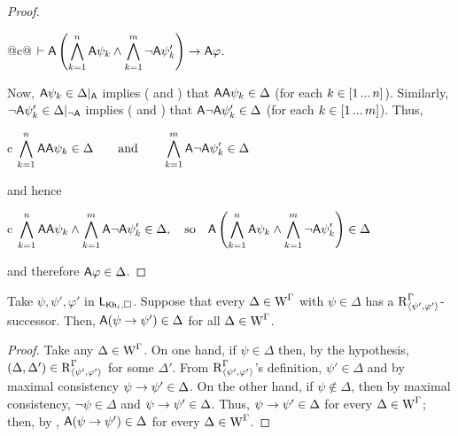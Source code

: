 \begin{proof}
\begin{ctabular}{@{}c@{}}
$\vdash
\displaystyle
{\sf A}\left( \bigwedge_{k=1}^{n} {\sf A}\psi_k \land \bigwedge_{k=1}^{m} \lnot {\sf A}\psi'_k \right)
\rightarrow {\sf A}\varphi$.
\end{ctabular}

Now, ${\sf A}\psi_k \in \Delta\vert_{{\sf A}}$ implies ( and ) that ${\sf A}{\sf A}\psi_k \in \Delta$ (for each $k \in [1 \mathop{...} n]$).
Similarly, $\lnot {\sf A}\psi'_k \in \Delta\vert_{\lnot{\sf A}}$ implies ( and ) that ${\sf A} \lnot {\sf A}\psi'_k \in \Delta$ (for each $k \in [1 \mathop{...} m]$). Thus,

\begin{ctabular}{c}
$\displaystyle
\bigwedge_{k=1}^{n} {\sf A}{\sf A}\psi_k \in \Delta \qquad\text{and}\qquad
\bigwedge_{k=1}^{m} {\sf A}\lnot{\sf A}\psi'_k \in \Delta$
\end{ctabular}

and hence

\begin{ctabular}{c}
$\displaystyle
\bigwedge_{k=1}^{n} {\sf A}{\sf A}\psi_k \land
\bigwedge_{k=1}^{m} {\sf A}\lnot{\sf A}\psi'_k \in \Delta,
\quad \text{so} \quad
{\sf A}
\left(
\bigwedge_{k=1}^{n} {\sf A}\psi_k \land
\bigwedge_{k=1}^{m} \lnot{\sf A}\psi'_k
\right)
\in \Delta$
\end{ctabular}

and therefore ${\sf A}\varphi \in \Delta$.
\end{proof}

\begin{proposition}\label{pro:cm-ults-khiml-succpre}
Take $\psi, \psi', \varphi'$ in $\mathsf{L}_{{\sf Kh}_i,\square}$. Suppose that every $\Delta \in \operatorname{W}^\Gamma$ with $\psi \in \Delta$ has a $\operatorname{R}^{\Gamma}_{\langle \psi',\varphi' \rangle}$-successor. Then, ${\sf A}(\psi \rightarrow \psi') \in \Delta$ for all $\Delta \in \operatorname{W}^\Gamma$.
\end{proposition}
\begin{proof}
Take any $\Delta \in \operatorname{W}^\Gamma$. On one hand, if $\psi \in \Delta$ then, by the hypothesis, $(\Delta, \Delta') \in \operatorname{R}^{\Gamma}_{\langle \psi',\varphi' \rangle}$ for some $\Delta'$.
From $\operatorname{R}^{\Gamma}_{\langle \psi',\varphi' \rangle}$'s definition, $\psi' \in \Delta$ and by maximal consistency $\psi \rightarrow \psi' \in \Delta$.
On the other hand, if $\psi \not\in \Delta$, then by maximal consistency, $\lnot \psi \in \Delta$ and $\psi \rightarrow \psi' \in \Delta$.
Thus, $\psi \rightarrow \psi' \in \Delta$ for every $\Delta \in \operatorname{W}^\Gamma$; then, by , ${\sf A}(\psi \rightarrow \psi') \in \Delta$ for every $\Delta \in \operatorname{W}^\Gamma$.
\end{proof}

